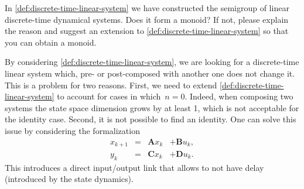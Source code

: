 \begin{exercise}
    In \cref{def:discrete-time-linear-system} we have constructed the semigroup of linear discrete-time dynamical systems.
    Does it form a monoid?
    If not, please explain the reason and suggest an extension to \cref{def:discrete-time-linear-system} so that you can obtain a monoid.
\end{exercise}
\begin{solution}
    By considering \cref{def:discrete-time-linear-system}, we are looking for a discrete-time linear system which, pre- or post-composed with another one does not change it.
    This is a problem for two reasons.
    First, we need to extend \cref{def:discrete-time-linear-system} to account for cases in which~$n=0$.
    Indeed, when composing two systems the state space dimension grows by at least 1, which is not acceptable for the identity case.
    Second, it is not possible to find an identity.
    One can solve this issue by considering the formalization
    \begin{equation}
        \label{eq:discrete-time-dynamics-D}
        \begin{aligned}
            x_{k+1} & = & \mathbf{A} x_k & + \mathbf{B} u_k, \\
            y_{k}   & = & \mathbf{C} x_k & + \mathbf{D} u_k.
        \end{aligned}
    \end{equation}
    This introduces a direct input/output link that allows to not have delay (introduced by the state dynamics).
\end{solution}

